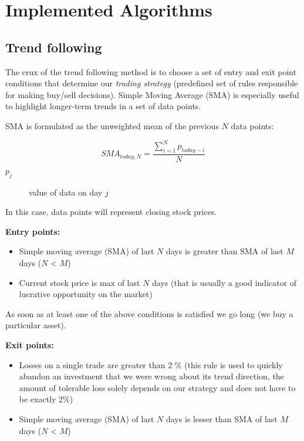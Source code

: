 \chapter{Implemented Algorithms}
\label{cha:implementedAlgorithms}



\section{Trend following}
\label{trend_following_impl}

The crux of the trend following method is to choose a set of entry and exit point conditions that determine our \emph{trading strategy} (predefined set of rules 
responsible for making buy/sell decisions).
Simple Moving Average (SMA) is especially useful to highlight longer-term trends in a set of data points.

SMA is formulated as the unweighted mean of the previous $N$ data points:

\begin{equation}
    SMA_{today,N} = \frac{\sum_{i=1}^{N}p_{today - i}}{N}
\end{equation}

\begin{description}
  \item [$p_{j}$] 
    value of data on day $j$
\end{description}

In this case, data points will represent closing stock prices. 
 


\textbf{Entry points:}
  \begin{itemize}
    \item Simple moving average (SMA) of last $N$ days is greater than SMA of last $M$ days ($N$ < $M$)
    \item Current stock price is max of last $N$ days (that is usually a good indicator of lucrative opportunity on the market)
  \end{itemize}

As soon as at least one of the above conditions is satisfied we go long (we buy a particular asset).


\textbf{Exit points:}
  \begin{itemize}
    \item Losses on a single trade are greater than 2 \% (this rule is used to quickly abandon an investment that we were wrong about its trend direction,
	  the amount of tolerable loss solely depends on our strategy and does not have to be exactly 2\%)
    \item Simple moving average (SMA) of last $N$ days is lesser than SMA of last $M$ days ($N$ < $M$)
  \end{itemize}

